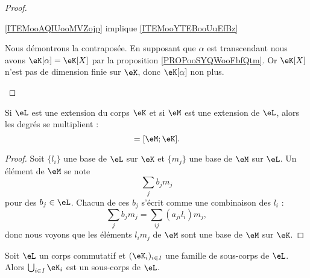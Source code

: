 \begin{proof}
\begin{subproof}
        \item[\ref{ITEMooAQIUooMVZojp} implique \ref{ITEMooYTEBooUuEfBz}]

            Nous démontrons la contraposée. En supposant que \( \alpha\) est transcendant nous avons \( \eK[\alpha]=\eK[X]\) par la proposition \ref{PROPooSYQWooFbfQtm}. Or \( \eK[X]\) n'est pas de dimension finie sur \( \eK\), donc \( \eK[\alpha]\) non plus.

    \end{subproof}
\end{proof}

\begin{proposition}     \label{PropGWazMpY}
    Si \( \eL\) est une extension du corps \( \eK\) et si \( \eM\) est une extension de \( \eL\), alors les degrés se multiplient :
    \begin{equation}
        [\eM:\eL][\eL:\eK]=[\eM;\eK].
    \end{equation}
\end{proposition}

\begin{proof}
    Soit \( \{ l_i \}\) une base de \( \eL\) sur \( \eK\) et \( \{ m_j \}\) une base de \( \eM\) sur \( \eL\). Un élément de \( \eM\) se note
    \begin{equation}
        \sum_{j}b_jm_j
    \end{equation}
    pour des \( b_j\in \eL\). Chacun de ces \( b_j\) s'écrit comme une combinaison des \( l_i\) :
    \begin{equation}
        \sum_{j}b_jm_j=\sum_{ij}(a_{ji}l_i)m_j,
    \end{equation}
    donc nous voyons que les éléments \( l_im_j\) de \( \eM\) sont une base de \( \eM\) sur \( \eK\).
\end{proof}

\begin{lemma}
    Soit \( \eL\) un corps commutatif et \( (\eK_i)_{i\in I}\) une famille de sous-corps de \( \eL\). Alors \( \bigcup_{i\in I}\eK_i\) est un sous-corps de \( \eL\).
\end{lemma}

